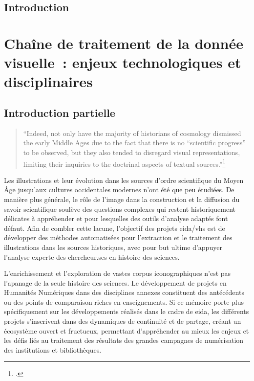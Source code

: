 \documentclass[a4paper,12pt,twoside]{book}
\newcommand{\eida}{\gls{eida}\xspace}
\newcommand{\vhs}{\gls{vhs}\xspace}
\newcommand{\ma}{Moyen Âge\xspace}
\newcommand{\clearemptydoublepage}{\newpage{\pagestyle{empty}\cleardoublepage}}
\newcommand\chapterNo[1]{%
 \chapter*{#1}
  \markboth{}{} %
  \markright{\MakeUppercase{#1}}
}
\newenvironment{kwote}
  {
    \begin{quote}
    \begin{singlespace}
    \small
  }
  {
    \normalsize
    \end{singlespace}
    \end{quote}
  }
\begin{document}
    \chapterNo{Introduction}
    
    

    \thispagestyle{empty}
    \clearemptydoublepage

\mainmatter

    \part{Chaîne de traitement de la donnée visuelle~: enjeux technologiques et disciplinaires}

\chapter*{Introduction partielle}

\begin{kwote}
``Indeed, not only have the majority of historians of cosmology dismissed
the early Middle Ages due to the fact that there is no ``scientific
progress'' to be observed, but they also tended to disregard visual
representations, limiting their inquiries to the doctrinal aspects of
textual sources.''\footcite[p.16]{obrist_visual_2012}
\end{kwote}

Les illustrations et leur évolution dans les sources d'ordre
scientifique du \ma jusqu'aux cultures occidentales modernes n'ont
été que peu étudiées. De manière plus générale, le rôle de l'image dans
la construction et la diffusion du savoir scientifique soulève des
questions complexes qui restent historiquement délicates à appréhender
et pour lesquelles des outils d'analyse adaptés font défaut. Afin de
combler cette lacune, l'objectif des projets \eida/\vhs est de développer
des méthodes automatisées pour l'extraction et le traitement des
illustrations dans les sources historiques, avec pour but ultime
d'appuyer l'analyse experte des chercheur.ses en histoire des sciences.

L'enrichissement et l'exploration de vastes corpus iconographiques n'est
pas l'apanage de la seule histoire des sciences. Le développement de
projets en Humanités Numériques dans des disciplines annexes constituent
des antécédents ou des points de comparaison riches en enseignements. Si
ce mémoire porte plus spécifiquement sur les développements réalisés
dans le cadre de \eida, les différents projets s'inscrivent dans des
dynamiques de continuité et de partage, créant un écosystème ouvert et
fructueux, permettant d'appréhender au mieux les enjeux et les défis
liés au traitement des résultats des grandes campagnes de numérisation
des institutions et bibliothèques.
\end{document}

